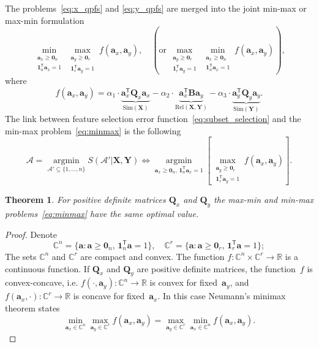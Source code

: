 \documentclass[12pt,twoside]{article}
\newtheorem{theorem}{Theorem}
\theoremstyle{definition}
\newcommand{\ba}{\mathbf{a}}
\newcommand{\bY}{\mathbf{Y}}
\newcommand{\bX}{\mathbf{X}}
\newcommand{\bB}{\mathbf{B}}
\newcommand{\bQ}{\mathbf{Q}}
\newcommand{\bbR}{\mathbb{R}}
\newcommand{\cA}{\mathcal{A}}
\newcommand{\T}{\mathsf{T}}
\newcommand{\bOne}{\boldsymbol{1}}
\newcommand{\bZero}{\boldsymbol{0}}
\newcommand{\argmin}{\mathop{\arg \min}\limits}
\begin{document}
The problems~\eqref{eq:x_qpfs} and \eqref{eq:y_qpfs} are merged into the joint min-max or max-min formulation
\begin{equation}
	\min_{\substack{\ba_x \geq \bZero_n \\ \bOne_n^{\T}\ba_x=1}} 	\max_{\substack{\ba_y \geq \bZero_r \\ \bOne_r^{\T}\ba_y=1}} f(\ba_x, \ba_y), \quad \left(\text {or} \, \max_{\substack{\ba_y \geq \bZero_r \\ \bOne_r^{\T}\ba_y=1}} \min_{\substack{\ba_x \geq \bZero_n \\ \bOne_n^{\T}\ba_x=1}} f(\ba_x, \ba_y)\right),
	\label{eq:minmax}
\end{equation}
where
\[
	f(\ba_x, \ba_y) = \alpha_1 \cdot \underbrace{\ba_x^{\T} \bQ_x \ba_x}_{\text{Sim}(\bX)} - \alpha_2 \cdot \underbrace{\ba_x^{\T} \bB \ba_y}_{\text{Rel}(\bX, \bY)} - \alpha_3 \cdot \underbrace{\ba_y^{\T} \bQ_y \ba_y}_{\text{Sim}(\bY)}.
\]
The link between feature selection error function~\eqref{eq:subset_selection} and the min-max problem~\eqref{eq:minmax} is the following
\begin{equation}
\cA = \argmin_{\cA' \subseteq \{1, \dots, n\}} S(\cA' | \bX, \bY) \Leftrightarrow \argmin_{\ba_x \geq \bZero_n, \, \bOne_n^{\T}\ba_x=1} \left[\max_{\substack{\ba_y \geq \bZero_r \\ \bOne_r^{\T}\ba_y=1}} f(\ba_x, \ba_y)\right].
\end{equation}
\begin{theorem}
	For positive definite matrices $\bQ_x$ and $\bQ_y$ the max-min and min-max problems~\eqref{eq:minmax} have the same optimal value.
\end{theorem}
\begin{proof}
	Denote
	\begin{equation*}
	\mathbb{C}^n = \{\ba : \ba \geq \bZero_n, \, \bOne_n^{\T}\ba=1\}, \quad \mathbb{C}^r = \{\ba : \ba \geq \bZero_r, \, \bOne_r^{\T}\ba=1\};
	\end{equation*}
	The sets $\mathbb{C}^n$ and $\mathbb{C}^r$ are compact and convex. The function $f: \mathbb{C}^n \times \mathbb{C}^r \rightarrow \bbR$ is a continuous function. If $\bQ_x$ and $\bQ_y$ are positive definite matrices, the function~$f$ is convex-concave, i.e.
	$f(\cdot, \ba_y): \mathbb{C}^n \rightarrow \bbR$ is convex for fixed~$\ba_y$, and $f(\ba_x, \cdot): \mathbb{C}^r \rightarrow \bbR$ is concave for fixed~$\ba_x$.
	In this case Neumann's minimax theorem states
	\[
	\min_{\ba_x \in \mathbb{C}^n} \max_{\ba_y \in \mathbb{C}^r} f(\ba_x, \ba_y) = \max_{\ba_y \in \mathbb{C}^r} \min_{\ba_x\in \mathbb{C}^n} f(\ba_x, \ba_y).
	\]
\end{proof}
\end{document}
